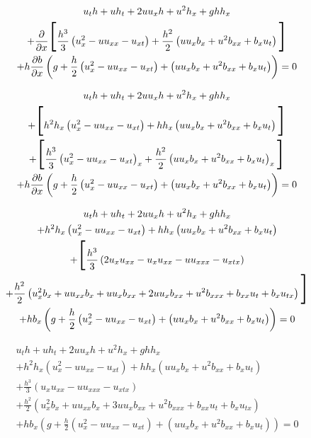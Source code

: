 \documentclass[12pt]{article}
\begin{document}
\begin{multline*}
u_th + uh_t + 2uu_xh + u^2h_x + ghh_x    \\ + \frac{\partial}{\partial x}\scalebox{3}{[} \frac{h^3}{3}\left(u_x^2 - uu_{xx} - u_{xt}\right) + \frac{h^2}{2} \left(uu_xb_x + u^2 b_{xx} + b_xu_t\right)\scalebox{3}{]}  \\ + h \frac{\partial b}{\partial x}\left(g +  \frac{h}{2}\left(u_x^2 - uu_{xx} - u_{xt}\right) + \left(uu_xb_x + u^2 b_{xx} + b_xu_t\right)\right) = 0
\end{multline*}

\begin{multline*}
u_th + uh_t + 2uu_xh + u^2h_x + ghh_x    \\ +\scalebox{3}{[} h^2h_x\left(u_x^2 - uu_{xx} - u_{xt}\right) + hh_x\left(uu_xb_x + u^2 b_{xx} + b_xu_t\right)\scalebox{3}{]} \\ + \scalebox{3}{[} \frac{h^3}{3}\left(u_x^2 - uu_{xx} - u_{xt}\right)_x + \frac{h^2}{2} \left(uu_xb_x + u^2 b_{xx} + b_xu_t\right)_x\scalebox{3}{]}  \\ + h \frac{\partial b}{\partial x}\left(g +  \frac{h}{2}\left(u_x^2 - uu_{xx} - u_{xt}\right) + \left(uu_xb_x + u^2 b_{xx} + b_xu_t\right)\right) = 0
\end{multline*}

\begin{multline*}
u_th + uh_t + 2uu_xh + u^2h_x + ghh_x    \\ + h^2h_x\left(u_x^2 - uu_{xx} - u_{xt}\right) + hh_x\left(uu_xb_x + u^2 b_{xx} + b_xu_t\right) \\ + \scalebox{3}{[} \frac{h^3}{3}\left(2u_xu_{xx} - u_xu_{xx} - u u_{xxx} - u_{xtx}\right)  \\ + \frac{h^2}{2} \left( u_x^2b_x + uu_{xx}b_x +uu_xb_{xx} + 2uu_xb_{xx}+ u^2b_{xxx}  + b_{xx}u_t + b_xu_{tx}\right)\scalebox{3}{]}  \\ + h b_x\left(g +  \frac{h}{2}\left(u_x^2 - uu_{xx} - u_{xt}\right) + \left(uu_xb_x + u^2 b_{xx} + b_xu_t\right)\right) = 0
\end{multline*}

\begin{multline*}
u_th + uh_t + 2uu_xh + u^2h_x + ghh_x    \\ + h^2h_x\left(u_x^2 - uu_{xx} - u_{xt}\right) + hh_x\left(uu_xb_x + u^2 b_{xx} + b_xu_t\right) \\ + \frac{h^3}{3}\left(u_xu_{xx} - u u_{xxx} - u_{xtx}\right)  \\ + \frac{h^2}{2} \left( u_x^2b_x + uu_{xx}b_x + 3uu_xb_{xx}+ u^2b_{xxx}  + b_{xx}u_t + b_xu_{tx}\right) \\ + h b_x\left(g +  \frac{h}{2}\left(u_x^2 - uu_{xx} - u_{xt}\right) + \left(uu_xb_x + u^2 b_{xx} + b_xu_t\right)\right) = 0
\end{multline*}
\end{document}
